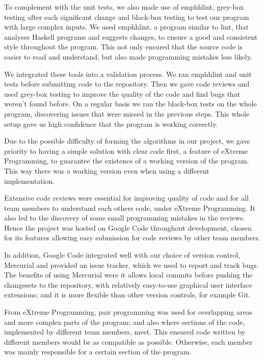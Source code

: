 To complement with the unit tests, we also made use of emph{hlint}, grey-box testing after each significant change and black-box testing to test our program with large complex inputs. We used emph{hlint}, a program similar to lint, that analyses Haskell programs and suggests changes, to ensure a good and consistent style throughout the program. This not only ensured that the source code is easier to read and understand, but also made programming mistakes less likely.

We integrated these tools into a validation process. We ran emph{hlint} and unit tests before submitting code to the repository. Then we gave code reviews and used grey-box testing to improve the quality of the code and find bugs that weren't found before. On a regular basis we ran the black-box tests on the whole program, discovering issues that were missed in the previous steps. This whole setup gave us high confidence that the program is working correctly.

Due to the possible difficulty of forming the algorithms in our project, we gave priority to having a simple solution with clear code first, a feature of eXtreme Programming, to guarantee the existence of a working version of the program. This way there was a working version even when using a different implementation.

Extensive code reviews were essential for improving quality of code and for all team members to understand each others code, under eXtreme Programming. It also led to the discovery of some small programming mistakes in the reviews. Hence the project was hosted on Google Code throughout development, chosen for its features allowing easy submission for code reviews by other team members.

In addition, Google Code integrated well with our choice of version control, Mercurial and provided an issue tracker, which we used to report and track bugs. The benefits of using Mercurial were it allows local commits before pushing the changesets to the repository, with relatively easy-to-use graphical user interface extensions; and it is more flexible than other version controls, for example Git.

From eXtreme Programming, pair programming was used for overlapping areas and more complex parts of the program; and also where sections of the code, implemented by different team members, meet. This ensured code written by different members would be as compatible as possible. Otherwise, each member was mainly responsible for a certain section of the program.


